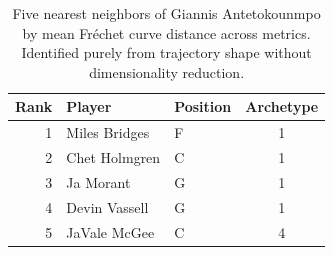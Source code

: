 \begin{table}[htbp]
  \centering\small
  \begin{tabular}{rllc}
    \toprule
    Rank & Player & Position & Archetype \\
    \midrule
    1 & Miles Bridges & F & 1 \\
    2 & Chet Holmgren & C & 1 \\
    3 & Ja Morant & G & 1 \\
    4 & Devin Vassell & G & 1 \\
    5 & JaVale McGee & C & 4 \\
    \bottomrule
  \end{tabular}
  \caption{Five nearest neighbors of Giannis Antetokounmpo by mean Fr\'{e}chet curve distance across metrics. Identified purely from trajectory shape without dimensionality reduction.}
  \label{tab:Giannis_Antetokounmpo_frechet_curve_neighbors}
\end{table}

